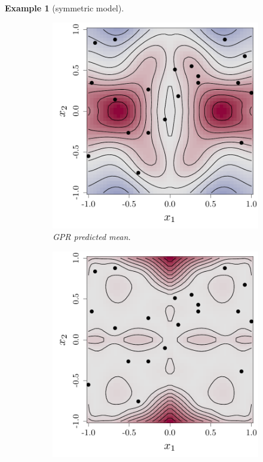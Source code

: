 \documentclass[twoside,openright]{report}
\newtheorem{example}{Example}
\begin{document}
\begin{example}[symmetric model]
\begin{figure}[ht!]
\begin{subfigure}[t]{0.30\textwidth}
                \includegraphics[width=\textwidth]{figures/ch5_symmean}
                \caption{GPR predicted mean.}
        \end{subfigure}
        \hspace{0.2cm}       
        \begin{subfigure}[t]{0.30\textwidth}
                \includegraphics[width=\textwidth]{figures/ch5_symsd}

\end{subfigure}
\end{figure}
\end{example}
\end{document}
